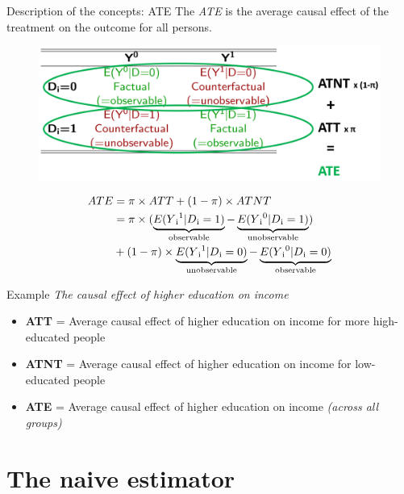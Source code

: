 \documentclass{beamer}\usepackage[]{graphicx}\usepackage[]{color}
\begin{document}
\begin{frame}{Description of the concepts: ATE}
The \textit{ATE} is the average causal effect of the treatment on the outcome for all persons.
\begin{figure}
\centering
\includegraphics[width=1\textwidth]{Graphics/ATE.png}
\end{figure}
\begin{align*}
ATE &= \pi \times ATT + (1-\pi) \times ATNT \\
&= \pi \times (\underbrace{E(Y\textsubscript{i}\textsuperscript{1} \vert D\textsubscript{i}=1)}_\text{observable} - \underbrace{E(Y\textsubscript{i}\textsuperscript{0} \vert D\textsubscript{i}=1)}_\text{unobservable}) \\
&+ (1-\pi) \times \underbrace{E(Y\textsubscript{i}\textsuperscript{1} \vert D\textsubscript{i}=0)}_\text{unobservable} - \underbrace{E(Y\textsubscript{i}\textsuperscript{0} \vert D\textsubscript{i}=0)}_\text{observable}
\end{align*}
\end{frame}



\begin{frame}{Example}
\textit{The causal effect of higher education on income} \\[2em]
  \begin{itemize}
    \item \textbf{ATT} = Average causal effect of higher education on income for more high-educated people
    \item \textbf{ATNT} = Average causal effect of higher education on income for low-educated people
   \item \textbf{ATE} = Average causal effect of higher education on income \textit{(across all groups)}
  \end{itemize}
\end{frame}


\section{The naive estimator} %
\end{document}
